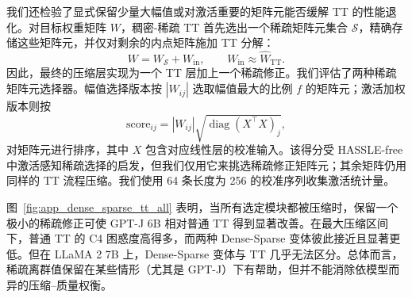 我们还检验了显式保留少量大幅值或对激活重要的矩阵元能否缓解 TT 的性能退化。对目标权重矩阵 $W$，稠密-稀疏 TT 首先选出一个稀疏矩阵元集合 $\mathcal{S}$，精确存储这些矩阵元，并仅对剩余的内点矩阵施加 TT 分解：
\[
    W = W_{\mathcal{S}} + W_{\mathrm{in}},
    \qquad
    W_{\mathrm{in}} \approx \widehat{W}_{\mathrm{TT}} .
\]
因此，最终的压缩层实现为一个 TT 层加上一个稀疏修正。我们评估了两种稀疏矩阵元选择器。幅值选择版本按 $|W_{ij}|$ 选取幅值最大的比例 $f$ 的矩阵元；激活加权版本则按
\[
    \mathrm{score}_{ij}
    =
    |W_{ij}|
    \sqrt{\operatorname{diag}(X^\top X)_j},
\]
对矩阵元进行排序，其中 $X$ 包含对应线性层的校准输入。该得分受 HASSLE-free 中激活感知稀疏选择的启发，但我们仅用它来挑选稀疏修正矩阵元；其余矩阵仍用同样的 TT 流程压缩。我们使用 64 条长度为 256 的校准序列收集激活统计量。

图~\ref{fig:app_dense_sparse_tt_all} 表明，当所有选定模块都被压缩时，保留一个极小的稀疏修正可使 GPT-J 6B 相对普通 TT 得到显著改善。在最大压缩区间下，普通 TT 的 C4 困惑度高得多，而两种 Dense-Sparse 变体彼此接近且显著更低。但在 LLaMA 2 7B 上，Dense-Sparse 变体与 TT 几乎无法区分。总体而言，稀疏离群值保留在某些情形（尤其是 GPT-J）下有帮助，但并不能消除依模型而异的压缩--质量权衡。


